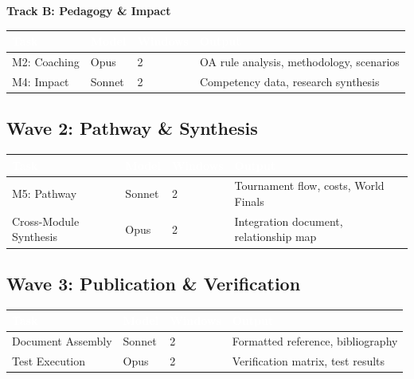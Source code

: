 \documentclass[11pt,letterpaper]{article}
\newcommand{\tableheader}[1]{\textbf{\sffamily\textcolor{white}{#1}}}
\begin{document}
\textbf{Track B: Pedagogy \& Impact}

\begin{center}
\begin{tabularx}{\textwidth}{L{3cm}C{1.5cm}C{1.5cm}X}
\toprule
{}
\tableheader{Task} & \tableheader{Model} & \tableheader{Windows} & \tableheader{Output} \\
\midrule
M2: Coaching & Opus & 2 & OA rule analysis, methodology, scenarios \\
M4: Impact & Sonnet & 2 & Competency data, research synthesis \\
\bottomrule
\end{tabularx}
\end{center}

\subsection{Wave 2: Pathway \& Synthesis}

\begin{center}
\begin{tabularx}{\textwidth}{L{3cm}C{1.5cm}C{1.5cm}X}
\toprule
{}
\tableheader{Task} & \tableheader{Model} & \tableheader{Windows} & \tableheader{Output} \\
\midrule
M5: Pathway & Sonnet & 2 & Tournament flow, costs, World Finals \\
Cross-Module Synthesis & Opus & 2 & Integration document, relationship map \\
\bottomrule
\end{tabularx}
\end{center}

\subsection{Wave 3: Publication \& Verification}

\begin{center}
\begin{tabularx}{\textwidth}{L{3cm}C{1.5cm}C{1.5cm}X}
\toprule
{}
\tableheader{Task} & \tableheader{Model} & \tableheader{Windows} & \tableheader{Output} \\
\midrule
Document Assembly & Sonnet & 2 & Formatted reference, bibliography \\
Test Execution & Opus & 2 & Verification matrix, test results \\
\bottomrule
\end{tabularx}
\end{center}
\end{document}
